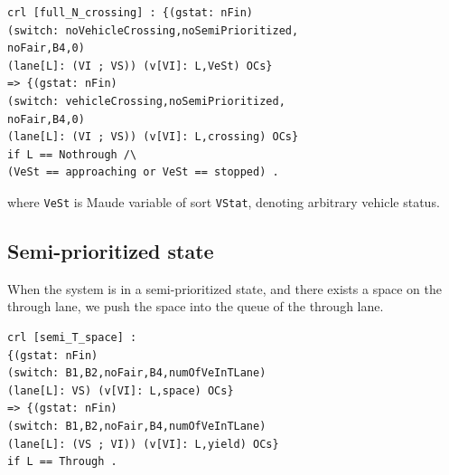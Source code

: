 \documentclass[10pt, conference, compsocconf]{IEEEtran}
\begin{document}
\begin{small}
\begin{verbatim}
crl [full_N_crossing] : {(gstat: nFin) 
(switch: noVehicleCrossing,noSemiPrioritized,
noFair,B4,0) 
(lane[L]: (VI ; VS)) (v[VI]: L,VeSt) OCs} 
=> {(gstat: nFin) 
(switch: vehicleCrossing,noSemiPrioritized,
noFair,B4,0) 
(lane[L]: (VI ; VS)) (v[VI]: L,crossing) OCs}
if L == Nothrough /\ 
(VeSt == approaching or VeSt == stopped) .
\end{verbatim}
\end{small}

\noindent
where \verb!VeSt! is Maude variable of sort \verb!VStat!, denoting arbitrary vehicle status.

\subsection{Semi-prioritized state}

%

When the system is in a semi-prioritized state, and there exists a space on the through lane, we push the space into the queue of the through lane.

\begin{small}
\begin{verbatim}
crl [semi_T_space] :
{(gstat: nFin) 
(switch: B1,B2,noFair,B4,numOfVeInTLane) 
(lane[L]: VS) (v[VI]: L,space) OCs}
=> {(gstat: nFin) 
(switch: B1,B2,noFair,B4,numOfVeInTLane) 
(lane[L]: (VS ; VI)) (v[VI]: L,yield) OCs}
if L == Through .
\end{verbatim}
\end{small}
\end{document}
